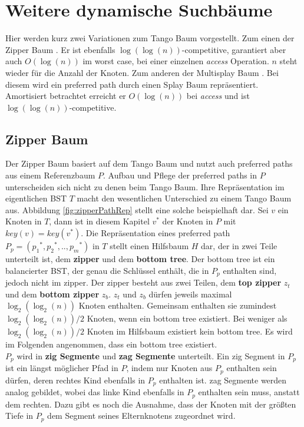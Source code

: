 \documentclass[a4paper,12pt]{article}
\begin{document}
\section {Weitere dynamische Suchbäume}
Hier werden kurz zwei Variationen zum Tango Baum vorgestellt. Zum einen der Zipper Baum \cite{zipper}. Er ist ebenfalls $\log\left(\log\left(n\right)\right)$-competitive,  garantiert aber auch  $O\left(\log \left(n\right)\right)$ im worst case, bei einer einzelnen \textit{access} Operation. $n$ steht wieder für die Anzahl der Knoten. Zum anderen der Multisplay Baum \cite{multisplay}. Bei diesem wird ein preferred path durch einen Splay Baum repräsentiert. Amortisiert betrachtet erreicht er $O\left(\log \left(n\right)\right)$ bei \textit{access} und ist  $\log\left(\log\left(n\right)\right)$-competitive. 

\subsection{Zipper Baum}
Der Zipper Baum basiert auf dem Tango Baum und nutzt auch preferred paths aus einem Referenzbaum $P$. Aufbau und Pflege der preferred paths in $P$ unterscheiden sich nicht zu denen beim Tango Baum.  Ihre Repräsentation im eigentlichen BST $T$ macht den wesentlichen Unterschied zu einem Tango Baum aus. Abbildung \ref{fig:zipperPathRep} stellt eine solche beispielhaft dar.  Sei $v$ ein Knoten in $T$, dann ist in diesem Kapitel $v^*$ der Knoten in $P$ mit $\mathit{key}\left(v\right) =\mathit{key}\left(v^*\right)$. Die Repräsentation eines preferred path  $P_p = \left({p_1}^*,{p_2}^*,..,{p_m}^*\right)$ in $T$ stellt einen Hilfsbaum $H$ dar, der in zwei Teile unterteilt ist, dem \textbf{zipper} und dem \textbf{bottom tree}.  Der bottom tree ist ein balancierter BST, der genau die Schlüssel enthält, die in $P_p$ enthalten sind, jedoch nicht im zipper. Der zipper besteht aus zwei Teilen, dem \textbf{top zipper} $z_t$ und dem \textbf{bottom zipper} $z_b$. $z_t$ und $z_b$ dürfen jeweils maximal $\log_2\left(\log_2\left(n\right)\right)$ Knoten enthalten. Gemeinsam  enthalten sie zumindest $\log_2\left(\log_2\left(n\right)\right) / 2$ Knoten, wenn ein bottom tree existiert. Bei weniger als $\log_2\left(\log_2\left(n\right)\right) / 2$ Knoten im Hilfsbaum existiert kein bottom tree. Es wird im Folgenden angenommen, dass ein bottom tree existiert. \\
$P_p$ wird in \textbf{zig Segmente} und \textbf{zag Segmente} unterteilt. Ein zig Segment in $P_p$ ist ein längst möglicher Pfad in $P$, indem nur Knoten aus $P_p$ enthalten sein dürfen, deren rechtes Kind ebenfalls in $P_p$ enthalten ist. zag Segmente werden analog gebildet, wobei das linke Kind ebenfalls in $P_p$ enthalten sein muss, anstatt dem rechten. Dazu gibt es noch die Ausnahme, dass der Knoten mit der größten Tiefe in $P_p$ dem Segment seines Elternknotens zugeordnet wird.\\
\end{document}
